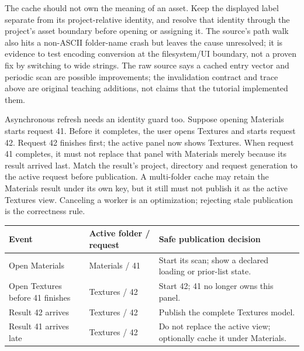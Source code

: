 The cache should not own the meaning of an asset. Keep the displayed label separate from its project-relative identity, and resolve that identity through the project's asset boundary before opening or assigning it. The source's path walk also hits a non-ASCII folder-name crash but leaves the cause unresolved; it is evidence to test encoding conversion at the filesystem/UI boundary, not a proven fix by switching to wide strings. The raw source says a cached entry vector and periodic scan are possible improvements; the invalidation contract and trace above are original teaching additions, not claims that the tutorial implemented them.

Asynchronous refresh needs an identity guard too. Suppose opening Materials starts request 41. Before it completes, the user opens Textures and starts request 42. Request 42 finishes first; the active panel now shows Textures. When request 41 completes, it must not replace that panel with Materials merely because its result arrived last. Match the result's project, directory and request generation to the active request before publication. A multi-folder cache may retain the Materials result under its own key, but it still must not publish it as the active Textures view. Canceling a worker is an optimization; rejecting stale publication is the correctness rule.

{\def\LTcaptype{none} %
\begin{longtable}[]{@{}
  >{\raggedright\arraybackslash}p{}
  >{\raggedright\arraybackslash}p{}
  >{\raggedright\arraybackslash}p{}@{}}
\toprule\noalign{}
\begin{minipage}[b]{\linewidth}\raggedright
Event
\end{minipage} & \begin{minipage}[b]{\linewidth}\raggedright
Active folder / request
\end{minipage} & \begin{minipage}[b]{\linewidth}\raggedright
Safe publication decision
\end{minipage} \\
\midrule\noalign{}
\endhead
\bottomrule\noalign{}
\endlastfoot
Open Materials & Materials / 41 & Start its scan; show a declared loading or prior-list state. \\
Open Textures before 41 finishes & Textures / 42 & Start 42; 41 no longer owns this panel. \\
Result 42 arrives & Textures / 42 & Publish the complete Textures model. \\
Result 41 arrives late & Textures / 42 & Do not replace the active view; optionally cache it under Materials. \\
\end{longtable}
}


